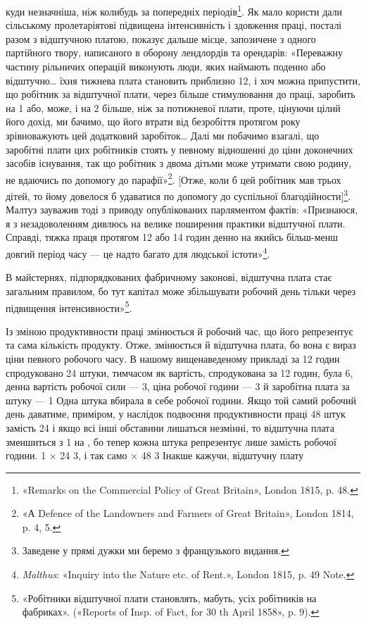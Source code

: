 \parcont{}  %
куди незначніша, ніж колибудь за попередніх періодів\footnote{
«Remarks on the Commercial Policy of Great Britain», London
1815, p. 48.
}. Як
мало користи дали сільському пролетаріятові підвищена інтенсивність
і здовження праці, посталі разом з відштучною платою,
показує дальше місце, запозичене з одного партійного твору,
написаного в оборону лендлордів та орендарів: «Переважну
частину рільничих операцій виконують люди, яких наймають
поденно або відштучно\dots{} їхня тижнева плата становить приблизно
12, і хоч можна припустити, що робітник за відштучної
плати, через більше стимулювання до праці, заробить на 1 або,
може, і на 2 більше, ніж за потижневої плати, проте,
цінуючи цілий його дохід, ми бачимо, що його втрати від безробіття
протягом року зрівноважують цей додатковий заробіток\dots{}
Далі ми побачимо взагалі, що заробітні плати цих робітників
стоять у певному відношенні до ціни доконечних засобів існування,
так що робітник з двома дітьми може утримати свою родину,
не вдаючись по допомогу до парафії»\footnote{
«А Defence of the Landowners and Farmers of Great Britain», London
1814, p. 4, 5.
}. [Отже, коли б цей
робітник мав трьох дітей, то йому довелося б удаватися по допомогу
до суспільної благодійности]\footnote*{
Заведене у прямі дужки ми беремо з французького видання. 
}. Малтуз зауважив тоді з
приводу опублікованих парляментом фактів: «Признаюся, я з
незадоволенням дивлюсь на велике поширення практики відштучної
плати. Справді, тяжка праця протягом 12 або 14 годин
денно на якийсь більш-менш довгий період часу — це надто багато
для людської істоти»\footnote{
\emph{Malthus}: «Inquiry into the Nature etc. of Rent.», London 1815,
p. 49 Note.
}.

В майстернях, підпорядкованих фабричному законові, відштучна
плата стає загальним правилом, бо тут капітал може збільшувати
робочий день тільки через підвищення інтенсивности»\footnote{
«Робітники відштучної плати становлять, мабуть,  усіх робітників
на фабриках». («Reports of Insp. of Fact, for 30 th April
1858», p. 9).
}.

Із зміною продуктивности праці змінюється й робочий час,
що його репрезентує та сама кількість продукту. Отже, змінюється
й відштучна плата, бо вона є вираз ціни певного робочого
часу. В нашому вищенаведеному прикладі за 12 годин спродуковано
24 штуки, тимчасом як вартість, спродукована за 12 годин,
була 6, денна вартість робочої сили — 3,
ціна робочої години — 3 й заробітна плата за штуку —
1 Одна штука вбирала в себе  робочої години. Якщо
той самий робочий день даватиме, приміром, у наслідок подвоєння
продуктивности праці 48 штук замість 24 і якщо всі інші
обставини лишаться незмінні, то відштучна плата зменшиться
з 1 на , бо тепер кожна штука репрезентує лише
 замість  робочої години. 1 × 24 \deq{} 3, і так
само  × 48 \deq{} 3 Інакше кажучи, відштучну плату
\parbreak{}  %
